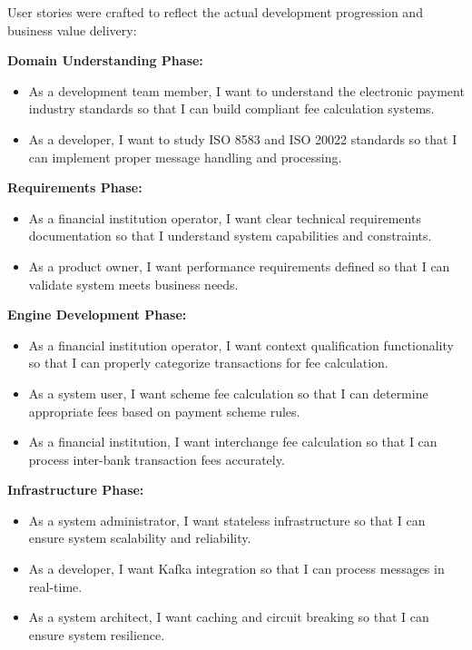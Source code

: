 User stories were crafted to reflect the actual development progression and business value delivery:

\textbf{Domain Understanding Phase:}
\begin{itemize}
    \item As a development team member, I want to understand the electronic payment industry standards so that I can build compliant fee calculation systems.
    \item As a developer, I want to study ISO 8583 and ISO 20022 standards so that I can implement proper message handling and processing.
\end{itemize}

\textbf{Requirements Phase:}
\begin{itemize}
    \item As a financial institution operator, I want clear technical requirements documentation so that I understand system capabilities and constraints.
    \item As a product owner, I want performance requirements defined so that I can validate system meets business needs.
\end{itemize}

\textbf{Engine Development Phase:}
\begin{itemize}
    \item As a financial institution operator, I want context qualification functionality so that I can properly categorize transactions for fee calculation.
    \item As a system user, I want scheme fee calculation so that I can determine appropriate fees based on payment scheme rules.
    \item As a financial institution, I want interchange fee calculation so that I can process inter-bank transaction fees accurately.
\end{itemize}

\textbf{Infrastructure Phase:}
\begin{itemize}
    \item As a system administrator, I want stateless infrastructure so that I can ensure system scalability and reliability.
    \item As a developer, I want Kafka integration so that I can process messages in real-time.
    \item As a system architect, I want caching and circuit breaking so that I can ensure system resilience.
\end{itemize}


